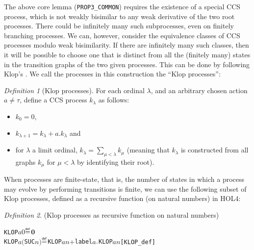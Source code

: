 \documentclass[GCNS]{yincog}
\renewcommand{\HOLConst}[1]{\texttt{#1}}
\renewcommand{\HOLNumLit}[1]{\ensuremath{#1}}
\renewcommand{\HOLFreeVar}[1]{\ensuremath{\mathit{#1}}}
\renewcommand{\HOLSymConst}[1]{#1}
\renewcommand{\HOLTokenDefEquality}{\ensuremath{\mathrel{\overset{\makebox [0pt]{\text{\tiny \textsf{def}}}}{=}}}}
\theoremstyle{remark}
\newtheorem{definition}{Definition}[section]
\theoremstyle{theorem}
\theoremstyle{remark}
\begin{document}
The above core lemma (\texttt{PROP3\_COMMON}) requires the existence of
a special CCS process, which is not weakly bisimilar to any weak derivative
of the two root processes. There could be infinitely many such subprocesses,
even on finitely branching processes. We can, however, consider the equivalence
classes of CCS processes modulo weak bisimilarity. If there are infinitely
many such classes, then it will be possible to choose one that is distinct
from all the (finitely many) states in the transition graphs of the two
given processes. This can be done by following Klop's . We call
the processes in this construction the ``Klop processes'':
%
\begin{definition}[Klop processes]
For each ordinal $\lambda $, and an arbitrary chosen action
$a \neq \tau $, define a CCS process $k_\lambda $ as follows:
%
\begin{itemize}
%
\item $k_0 = 0$,
%
\item $k_{\lambda +1} = k_\lambda + a.k_\lambda $ and
%
\item for $\lambda $ a limit ordinal,
$k_\lambda = \sum _{\mu < \lambda} k_\mu $ (meaning that
$k_\lambda $ is constructed from all graphs $k_\mu $ for
$\mu < \lambda $ by identifying their root).
%
\end{itemize}
%
\end{definition}
%
When processes are finite-state, that is, the number of states in which
a process may evolve by performing transitions is finite, we can use the
following subset of Klop processes, defined as a recursive function (on
natural numbers) in HOL4:
%
\begin{definition}%
{(Klop processes as recursive function on natural numbers)}
%
\begin{alltt}
   \HOLConst{KLOP} \HOLFreeVar{a} \HOLNumLit{0} \HOLTokenDefEquality{} \HOLConst{\ensuremath{\mathbf{0}}}
   \HOLConst{KLOP} \HOLFreeVar{a} \ensuremath{(}\HOLConst{SUC} \HOLFreeVar{n}\ensuremath{)} \HOLTokenDefEquality{} \HOLConst{KLOP} \HOLFreeVar{a} \HOLFreeVar{n} \HOLSymConst{\ensuremath{+}} \HOLConst{label} \HOLFreeVar{a}\HOLSymConst{\ensuremath{\ldotp}}\HOLConst{KLOP} \HOLFreeVar{a} \HOLFreeVar{n}\hfill{[KLOP\_def]}
\end{alltt}
%
\end{definition}
\end{document}
